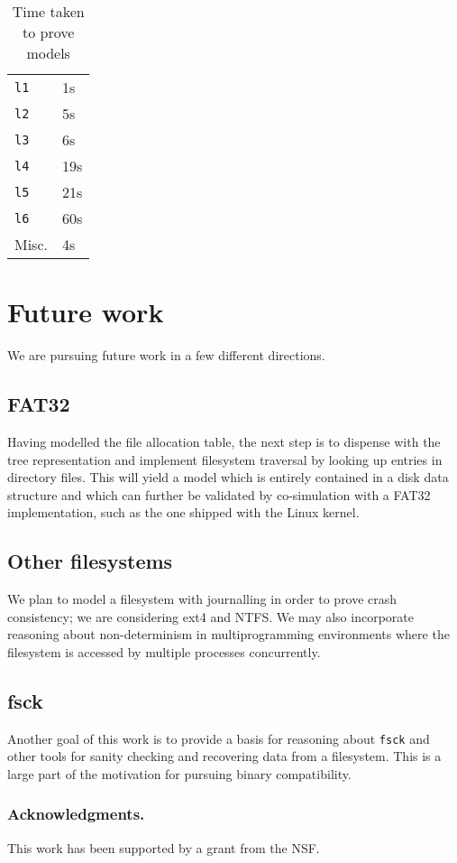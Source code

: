 \documentclass[runningheads,a4paper]{llncs}
\begin{document}
\begin{table}[]
  \centering
  \caption{Time taken to prove models}
  \label{certification-timing-table}
  \begin{tabular}{ll}
    \texttt{l1} & 1s \\
    \texttt{l2} & 5s \\
    \texttt{l3} & 6s \\
    \texttt{l4} & 19s \\
    \texttt{l5} & 21s \\
    \texttt{l6} & 60s \\
    Misc. & 4s \\
  \end{tabular}
\end{table}

\section{Future work}

We are pursuing future work in a few different directions.

\subsection{FAT32}

Having modelled the file allocation table, the next step is to
dispense with the tree representation and implement filesystem
traversal by looking up entries in directory files. This will yield a
model which is entirely contained in a disk data structure and which
can further be validated by co-simulation with a FAT32 implementation,
such as the one shipped with the Linux kernel.

\subsection{Other filesystems}

We plan to model a filesystem with journalling in order to prove crash
consistency; we are considering ext4 and NTFS. We may also incorporate
reasoning about non-determinism in multiprogramming environments where
the filesystem is accessed by multiple processes concurrently.

\subsection{fsck}
Another goal of this work is to provide a basis for reasoning about
\texttt{fsck} and other tools for sanity checking and recovering data
from a filesystem. This is a large part of the motivation for pursuing
binary compatibility.

\subsubsection*{Acknowledgments.} This work has been supported by a
grant from the NSF.



\end{document}

